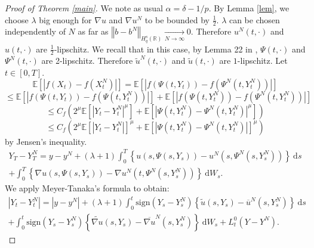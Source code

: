 \documentclass[11pt]{article}
\newcommand{\norme}[1]{\left\Vert #1\right\Vert}
\newcommand{\R}{\mathbb{R}}
\newcommand{\E}{\mathbb{E}}
\newcommand{\di}{\mathrm{d}}
\begin{document}
\begin{proof}[Proof of Theorem \ref{main}]
    We note as usual $\alpha = \delta - 1/p$.
    By Lemma \ref{lem}, we choose $\lambda$ big enough for $\nabla u$ and $\nabla u^N$ to be bounded by $\frac{1}{2}$. $\lambda$ can be chosen independently of $N$ as far as $\norme{b - b^N}_{H_q^s(\R)} \underset{N\rightarrow\infty}{\longrightarrow} 0$. Therefore $u^N(t,\cdot)$ and $u(t,\cdot)$ are $\frac{1}{2}$-lipschitz. We recall that in this case, by Lemma 22 in \cite{Fla-Iss-Rus-2017}, $\Psi(t,\cdot)$ and $\Psi^N(t,\cdot)$ are 2-lipschitz. Therefore $\widetilde{u}^N(t,\cdot)$ and $\widetilde{u}(t,\cdot)$ are $1$-lipschitz. Let $t\in[0,T]$.      
    \begin{equation*}
    \E\left[\left|f\left(X_t\right)-f\left(X_t^N\right)\right|\right] = \E\left[\left|f\left(\Psi\left(t,Y_t\right)\right)-f\left(\Psi^N\left(t,Y_t^N\right)\right)\right|\right]
    \end{equation*}   
    \begin{equation*}
    \leq  \E\left[\left|f\left(\Psi\left(t,Y_t\right)\right)-f\left(\Psi\left(t,Y_t^N\right)\right)\right|\right]+\E\left[\left|f\left(\Psi\left(t,Y_t^N\right)\right)-f\left(\Psi^N\left(t,Y_t^N\right)\right)\right|\right]
    \end{equation*}  
    \begin{equation*}
    \leq C_f  \left(2^\mu\E\left[\left|Y_t-Y_t^N\right|^\mu\right]+\E\left[\left|\Psi\left(t,Y_t^N\right)-\Psi^N\left(t,Y_t^N\right)\right|^\mu\right]\right)
    \end{equation*}
    \begin{equation}\label{jensen}
    \leq C_f  \left(2^\mu\E\left[\left|Y_t-Y_t^N\right|\right]^\mu+\E\left[\left|\Psi\left(t,Y_t^N\right)-\Psi^N\left(t,Y_t^N\right)\right|\right]^\mu\right)
    \end{equation}    
    by Jensen's inequality. 
    \begin{multline*}
    Y_T-Y_T^N = y-y^N + (\lambda + 1 )\int_0^T\left\{u\left(s,\Psi\left(s,Y_s\right)\right)-u^N\left(s,\Psi^N\left(s,Y_s^N\right)\right)\right\}\ \di s\\ + \int_0^T\left\{\nabla u\left(s,\Psi\left(s,Y_s\right)\right)-\nabla u^N\left(t,\Psi^N\left(s,Y_s^N\right)\right)\right\}\ \di W_s.
    \end{multline*}
    We apply Meyer-Tanaka's formula to obtain:
    \begin{multline*}
    \left|Y_t-Y_t^N\right| = \left|y-y^N\right| + (\lambda + 1) \int_0^t\mathrm{sign}(Y_s-Y_s^N)\left\{\widetilde{u}\left(s,Y_s\right)-\overline{u}^N\left(s,Y_s^N\right)\right\}\ \di s\\ + \int_0^t\mathrm{sign}(Y_s-Y_s^N)\left\{\widetilde{\nabla u}\left(s,Y_s\right)-\overline{\nabla u}^N\left(s,Y_s^N\right)\right\}\ \di W_s + L_t^0(Y-Y^N).

\end{multline*}
\end{proof}
\end{document}
